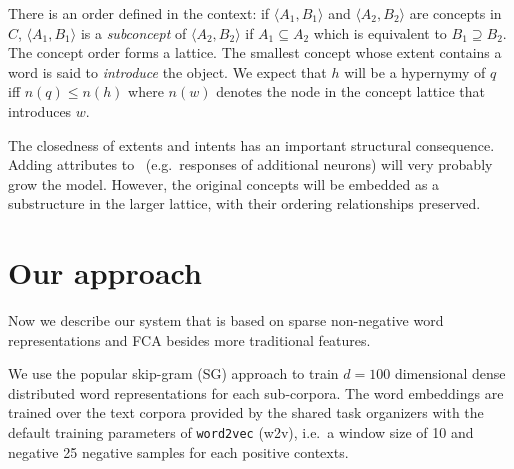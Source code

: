 \documentclass[11pt,a4paper]{article}
\begin{document}
There is an order defined in the context:
if $\langle A_1 , B_1 \rangle$ and $\langle A_2 , B_2 \rangle$ are concepts in
$C$, $\langle A_1 , B_1 \rangle$ is a \emph{subconcept} of $\langle A_2 , B_2
\rangle$ if $A_1 \subseteq A_2 $ which is equivalent to $B_1 \supseteq B_2 $.  
The concept order forms a %
lattice.
The smallest concept whose extent contains a word is said to
\emph{introduce} the object.
We expect that $h$ will be a hypernymy of $q$ iff $n(q)\le n(h)$ where $n(w)$
denotes the node in the concept lattice that introduces $w$.

The closedness of extents and intents has an important structural consequence. 
Adding attributes to \at~(e.g.~responses of
additional neurons) will very probably grow the model.  However, the original
concepts will be embedded as a substructure in the larger lattice, with their
ordering relationships preserved.

\section{Our approach}

Now we describe our system that is based on sparse non-negative word
representations and FCA besides more traditional features.


We use the popular skip-gram (SG) %
approach \citep{Mikolov:2013f} to train $d=100$ dimensional dense distributed
word representations for each sub-corpora. The word embeddings are trained over the text corpora provided by the shared task organizers with the default training parameters of \texttt{word2vec} (w2v), i.e.~a window size of 10 and negative 25 negative samples for each positive contexts.
\end{document}

